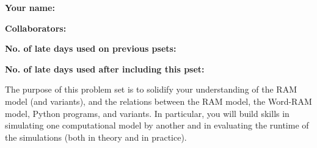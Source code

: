 \documentclass[11pt]{article}
\begin{document}

\textbf{Your name: }

\textbf{Collaborators: }

\textbf{No. of late days used on previous psets: }

\textbf{No. of late days used after including this pset: }

\newcommand{\cmd}{\texttt{cmd}}
\newcommand{\READ}{\texttt{read}}
\newcommand{\W}{\texttt{W}}
\newcommand{\result}{\texttt{result}}
\newcommand{\counter}{\texttt{counter}}

The purpose of this problem set is to solidify your understanding of the RAM model (and variants), and the relations between the RAM model, the Word-RAM model, Python programs, and variants. In particular, you will build skills in simulating one computational model by another and in evaluating the runtime of the simulations (both in theory and in practice).
\end{document}
